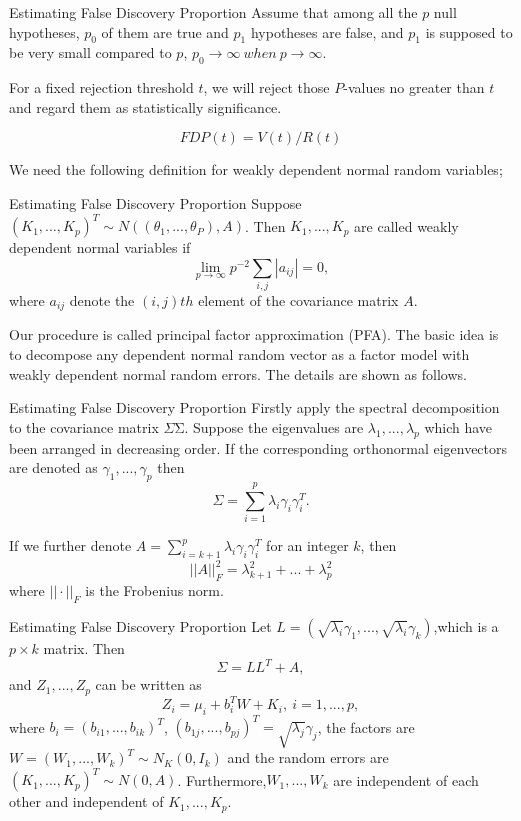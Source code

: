 \documentclass{beamer}
\begin{document}
\begin{frame}[t]{Estimating False Discovery Proportion}\vspace{10pt}
Assume that among all the $p$ null hypotheses, $p_0$ of them are true and $p_1$ hypotheses are false, and $p_1$ is supposed to be very small compared to $p$, $p_0 \rightarrow \infty \ when \ p\rightarrow \infty $.

For a fixed rejection threshold $t$, we will reject those $P$-values no greater than $t$ and regard them as statistically significance.

$$ FDP(t) = V (t)/R(t) $$

We need the following definition for weakly dependent normal random variables;
\end{frame}

\begin{frame}[t]{Estimating False Discovery Proportion}\vspace{10pt}
Suppose $(K_1,...,K_p)^T \sim N((\theta_1,...,\theta_P),A)$. Then $K_1,...,K_p$ are called weakly dependent normal variables if
$$ \lim_{p \rightarrow \infty}p^{-2} \sum_{i,j} |a_{ij}| = 0,$$
where $a_{ij}$ denote the $(i, j)th$ element of the covariance matrix $A$.

Our procedure is called principal factor approximation (PFA). The basic idea is to decompose any dependent normal random vector as a factor model with weakly dependent normal random errors. The details are shown as follows.
\end{frame}

\begin{frame}[t]{Estimating False Discovery Proportion}\vspace{10pt}
Firstly apply the spectral decomposition to the covariance matrix $\Sigma$Σ. Suppose the eigenvalues are $\lambda_1,...,\lambda_p$ which have been arranged in decreasing order. If the corresponding orthonormal eigenvectors are denoted as $\gamma_1,...,\gamma_p$ then
$$ \Sigma = \sum_{i=1}^p\lambda_i\gamma_i\gamma_i^T. $$

If we further denote $A = \sum_{i=k+1}^p\lambda_i\gamma_i\gamma_i^T$ for an integer $k$, then
$$||A||_F^2=\lambda_{k+1}^2+...+\lambda_{p}^2$$
where $|| \cdot ||_F$ is the Frobenius norm.
\end{frame}

\begin{frame}[t]{Estimating False Discovery Proportion}\vspace{10pt}
Let $L=(\sqrt{\lambda_i}\gamma_1,...,\sqrt{\lambda_i}\gamma_k)$,which is a $p \times k$ matrix. Then
$$ \Sigma = LL^T+A ,$$
and $Z_1,...,Z_p$ can be written as
\begin{equation} \label{eq1}
 Z_i = \mu_i + b_i^TW + K_i, \ i=1,...,p,
\end{equation}
where $b_i = (b_{i1},...,b_{ik})^T$, $(b_{1j},...,b_{pj})^T=\sqrt{\lambda_j}\gamma_j$, the factors are $W = (W_1,...,W_k)^T \sim N_K(0,I_k)$ and the random errors are $(K_1,...,K_p)^T \sim N(0,A)$. Furthermore,$W_1,...,W_k$ are independent of each other and independent of $K_1,...,K_p$.
\end{frame} 
\end{document}
